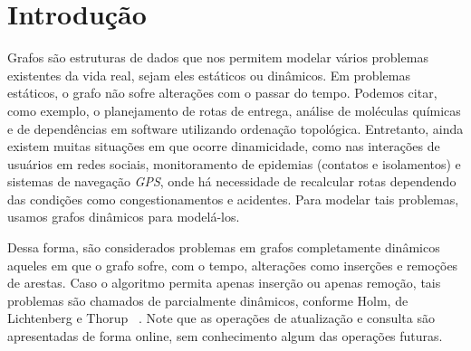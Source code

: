

\chapter{Introdução}
\label{cap:introducao}

\enlargethispage{.5\baselineskip}

Grafos são estruturas de dados que nos permitem modelar vários problemas existentes da vida real, sejam eles estáticos ou dinâmicos. Em problemas estáticos, o grafo não sofre alterações com o passar do tempo. Podemos citar, como exemplo, o planejamento de rotas de entrega, análise de moléculas químicas e de dependências em software utilizando ordenação topológica. Entretanto, ainda existem muitas situações em que ocorre dinamicidade, como nas interações de usuários em redes sociais, monitoramento de epidemias (contatos e isolamentos) e sistemas de navegação \textit{GPS}, onde há necessidade de recalcular rotas dependendo das condições como congestionamentos e acidentes. Para modelar tais problemas, usamos grafos dinâmicos para modelá-los.

Dessa forma, são considerados problemas em grafos completamente dinâmicos aqueles em que o grafo sofre, com o tempo, alterações como inserções e remoções 
de arestas. Caso o algoritmo permita apenas inserção ou apenas remoção, tais 
problemas são chamados de parcialmente dinâmicos, conforme Holm, de Lichtenberg e Thorup ~\cite{jacob_holm}. Note que as operações de 
atualização e consulta são apresentadas de forma online, sem conhecimento algum das operações futuras.

